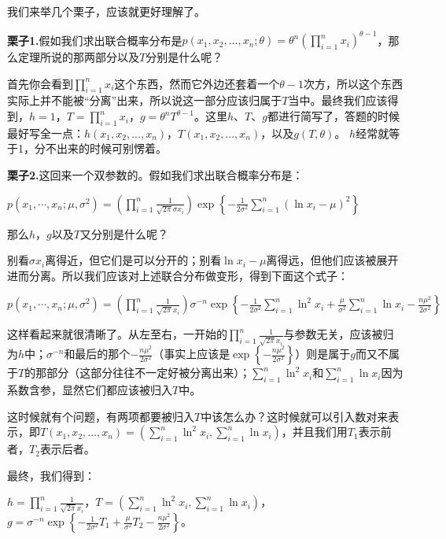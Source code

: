 \documentclass[10pt, a4paper]{article}
\begin{document}
我们来举几个栗子，应该就更好理解了。\par
\textbf{栗子1.}假如我们求出联合概率分布是$p(x_1,x_2,...,x_n;\theta)=\theta^{n}\left(\prod_{i=1}^{n} x_{i}\right)^{\theta-1}$，那么定理所说的那两部分以及$T$分别是什么呢？\par 首先你会看到$\prod_{i=1}^{n} x_{i}$这个东西，然而它外边还套着一个$\theta-1$次方，所以这个东西实际上并不能被“分离”出来，所以说这一部分应该归属于$T$当中。最终我们应该得到，$h=1$，$T=\prod_{i=1}^{n} x_{i}$，$g=\theta^{n}T^{\theta-1}$。这里$h$、$T$、$g$都进行简写了，答题的时候最好写全一点：$h(x_1,x_2,...,x_n)$，$T(x_1,x_2,...,x_n)$，以及$g(T,\theta)$。
$h$经常就等于1，分不出来的时候可别愣着。\\ \par
\textbf{栗子2.}这回来一个双参数的。假如我们求出联合概率分布是：
\begin{center}
    $p\left(x_{1}, \cdots, x_{n} ; \mu, \sigma^{2}\right)=\left(\prod_{i=1}^{n} \frac{1}{\sqrt{2 \pi} \sigma x_{i}} \right) \exp \left\{-\frac{1}{2 \sigma^{2}} \sum_{i=1}^{n}\left(\ln x_{i}-\mu\right)^{2}\right\}$
\end{center}
那么$h$，$g$以及$T$又分别是什么呢？\par
别看$\sigma x_{i}$离得近，但它们是可以分开的；别看$\ln x_{i}-\mu$离得远，但他们应该被展开进而分离。所以我们应该对上述联合分布做变形，得到下面这个式子：\begin{center}$p\left(x_{1}, \cdots, x_{n} ; \mu, \sigma^{2}\right)=\left( \prod_{i=1}^{n} \frac{1}{\sqrt{2 \pi} x_{i}} \right) \sigma^{-n} \exp \left\{-\frac{1}{2 \sigma^{2}} \sum_{i=1}^{n} \ln ^{2} x_{i}+\frac{\mu}{\sigma^{2}} \sum_{i=1}^{n} \ln x_{i}-\frac{n \mu^{2}}{2 \sigma^{2}}\right\}$\end{center}\par
这样看起来就很清晰了。从左至右，一开始的$\prod_{i=1}^{n} \frac{1}{\sqrt{2 \pi} x_{i}}$与参数无关，应该被归为$h$中；$\sigma^{-n}$和最后的那个$-\frac{n \mu^{2}}{2 \sigma^{2}}$（事实上应该是$\exp \left\{-\frac{n \mu^{2}}{2 \sigma^{2}}\right\}$）则是属于$g$而又不属于$T$的那部分（这部分往往不一定好被分离出来）；$\sum_{i=1}^{n} \ln ^{2} x_{i}$和$\sum_{i=1}^{n} \ln x_{i}$因为系数含参，显然它们都应该被归入$T$中。\par
这时候就有个问题，有两项都要被归入$T$中该怎么办？这时候就可以引入数对来表示，即$T(x_1,x_2,...,x_n)=(\sum_{i=1}^{n} \ln ^{2} x_{i},\sum_{i=1}^{n} \ln x_{i})$，并且我们用$T_1$表示前者，$T_2$表示后者。\par
最终，我们得到：
\begin{center}
$h=\prod_{i=1}^{n} \frac{1}{\sqrt{2 \pi} x_{i}}$，$T=(\sum_{i=1}^{n} \ln ^{2} x_{i},\sum_{i=1}^{n} \ln x_{i})$，$g=\sigma^{-n} \exp \left\{-\frac{1}{2 \sigma^{2}} T_1 +\frac{\mu}{\sigma^{2}} T_2 -\frac{n \mu^{2}}{2 \sigma^{2}}\right\}$。
\end{center} \par
\end{document}
